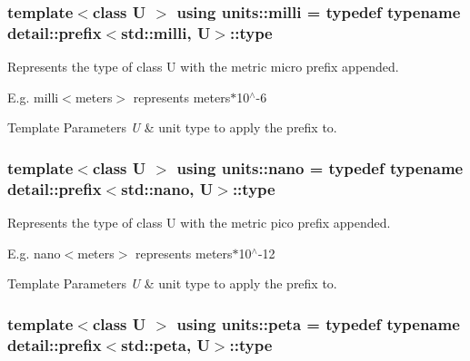 \subsubsection[{milli}]{\setlength{\rightskip}{0pt plus 5cm}template$<$class U $>$ using {\bf units\+::milli} = typedef typename detail\+::prefix$<$std\+::milli, U$>$\+::type}\label{group___unit_manipulators_gaec9d1c320e180eb59f3cb3094d8079dd}


Represents the type of {\ttfamily class U} with the metric \textquotesingle{}micro\textquotesingle{} prefix appended. 

E.\+g. milli$<$meters$>$ represents meters$\ast$10$^\wedge$-\/6 
\begin{DoxyTemplParams}{Template Parameters}
{\em U} & unit type to apply the prefix to. \\
\hline
\end{DoxyTemplParams}
\hypertarget{group___unit_manipulators_ga1c25c3c1d6c1f3aed3fd1ecf043110d5}{}
\subsubsection[{nano}]{\setlength{\rightskip}{0pt plus 5cm}template$<$class U $>$ using {\bf units\+::nano} = typedef typename detail\+::prefix$<$std\+::nano, U$>$\+::type}\label{group___unit_manipulators_ga1c25c3c1d6c1f3aed3fd1ecf043110d5}


Represents the type of {\ttfamily class U} with the metric \textquotesingle{}pico\textquotesingle{} prefix appended. 

E.\+g. nano$<$meters$>$ represents meters$\ast$10$^\wedge$-\/12 
\begin{DoxyTemplParams}{Template Parameters}
{\em U} & unit type to apply the prefix to. \\
\hline
\end{DoxyTemplParams}
\hypertarget{group___unit_manipulators_ga1a39274621859b9e6cf6e7019cd14e47}{}
\subsubsection[{peta}]{\setlength{\rightskip}{0pt plus 5cm}template$<$class U $>$ using {\bf units\+::peta} = typedef typename detail\+::prefix$<$std\+::peta, U$>$\+::type}\label{group___unit_manipulators_ga1a39274621859b9e6cf6e7019cd14e47}


